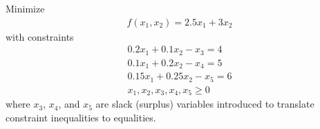 \documentclass[11pt]{article}
\begin{document}
\begin{sol}
Minimize 
\begin{eqnarray*}
f(x_{1}, x_{2}) = 2.5x_{1} + 3x_{2}
\end{eqnarray*}
with constraints 
\begin{eqnarray*}
0.2x_{1} + 0.1x_{2} - x_{3} = 4 \\
0.1x_{1} + 0.2x_{2} - x_{4} = 5 \\
0.15x_{1} + 0.25x_{2} - x_{5} = 6 \\
x_{1}, x_{2}, x_{3}, x_{4}, x_{5} \geq 0 
\end{eqnarray*}
where $x_{3}$, $x_{4}$, and $x_{5}$ are slack (surplus) variables introduced to translate constraint inequalities to equalities.
\end{sol}
\end{document}
